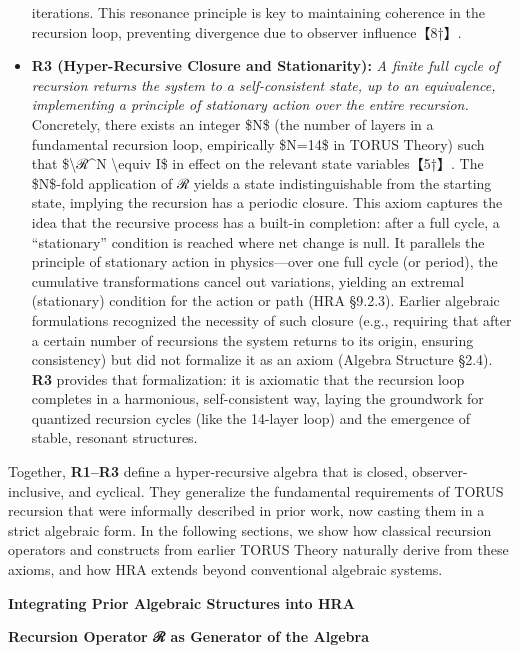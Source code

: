 \documentclass[]{article}
\begin{document}
\begin{itemize}
  iterations. This resonance principle is key to maintaining coherence
  in the recursion loop, preventing divergence due to observer
  influence【8†】.
\item
  \textbf{R3 (Hyper-Recursive Closure and Stationarity):} \emph{A finite
  full cycle of recursion returns the system to a self-consistent state,
  up to an equivalence, implementing a principle of stationary action
  over the entire recursion.} Concretely, there exists an integer \$N\$
  (the number of layers in a fundamental recursion loop, empirically
  \$N=14\$ in TORUS Theory) such that \$\textbackslash{}ℛ\^{}N
  \textbackslash{}equiv I\$ in effect on the relevant state
  variables【5†】. The \$N\$-fold application of ℛ yields a state
  indistinguishable from the starting state, implying the recursion has
  a periodic closure. This axiom captures the idea that the recursive
  process has a built-in completion: after a full cycle, a
  ``stationary'' condition is reached where net change is null. It
  parallels the principle of stationary action in physics---over one
  full cycle (or period), the cumulative transformations cancel out
  variations, yielding an extremal (stationary) condition for the action
  or path (HRA §9.2.3). Earlier algebraic formulations recognized the
  necessity of such closure (e.g., requiring that after a certain number
  of recursions the system returns to its origin, ensuring consistency)
  but did not formalize it as an axiom (Algebra Structure §2.4).
  \textbf{R3} provides that formalization: it is axiomatic that the
  recursion loop completes in a harmonious, self-consistent way, laying
  the groundwork for quantized recursion cycles (like the 14-layer loop)
  and the emergence of stable, resonant structures.
\end{itemize}

Together, \textbf{R1--R3} define a hyper-recursive algebra that is
closed, observer-inclusive, and cyclical. They generalize the
fundamental requirements of TORUS recursion that were informally
described in prior work, now casting them in a strict algebraic form. In
the following sections, we show how classical recursion operators and
constructs from earlier TORUS Theory naturally derive from these axioms,
and how HRA extends beyond conventional algebraic systems.

\textbf{Integrating Prior Algebraic Structures into HRA}

\textbf{Recursion Operator ℛ as Generator of the Algebra}
\end{document}
